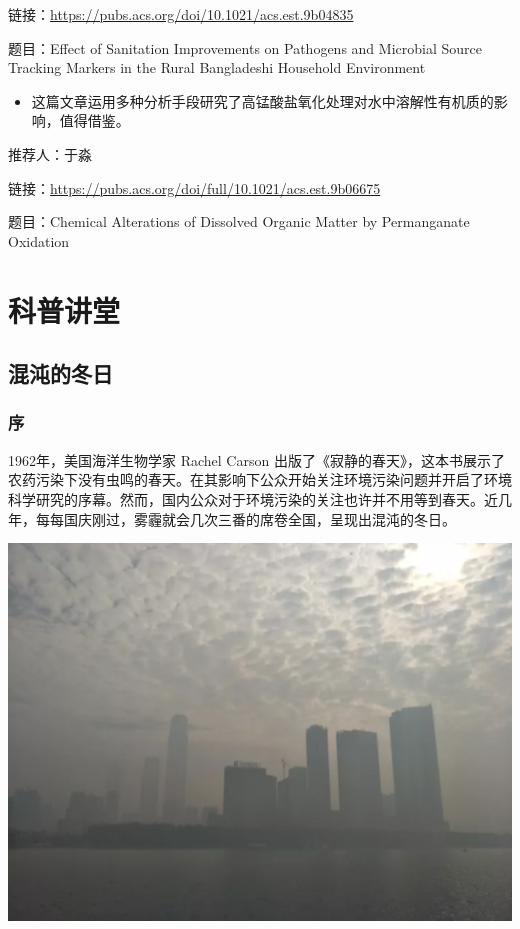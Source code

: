 \documentclass[]{book}
\providecommand{\tightlist}{%
  \setlength{\itemsep}{0pt}\setlength{\parskip}{0pt}}
\begin{document}
链接：\url{https://pubs.acs.org/doi/10.1021/acs.est.9b04835}

题目：Effect of Sanitation Improvements on Pathogens and Microbial Source Tracking Markers in the Rural Bangladeshi Household Environment

\begin{itemize}
\tightlist
\item
  这篇文章运用多种分析手段研究了高锰酸盐氧化处理对水中溶解性有机质的影响，值得借鉴。
\end{itemize}

推荐人：于淼

链接：\url{https://pubs.acs.org/doi/full/10.1021/acs.est.9b06675}

题目：Chemical Alterations of Dissolved Organic Matter by Permanganate Oxidation

\hypertarget{ux79d1ux666eux8bb2ux5802}{%
\chapter{科普讲堂}\label{ux79d1ux666eux8bb2ux5802}}

\hypertarget{ux6df7ux6c8cux7684ux51acux65e5}{%
\section{混沌的冬日}\label{ux6df7ux6c8cux7684ux51acux65e5}}

\hypertarget{ux5e8f}{%
\subsection{序}\label{ux5e8f}}

1962年，美国海洋生物学家 Rachel Carson 出版了《寂静的春天》，这本书展示了农药污染下没有虫鸣的春天。在其影响下公众开始关注环境污染问题并开启了环境科学研究的序幕。然而，国内公众对于环境污染的关注也许并不用等到春天。近几年，每每国庆刚过，雾霾就会几次三番的席卷全国，呈现出混沌的冬日。

\includegraphics[width=6.67in]{images/cw1}
\end{document}
